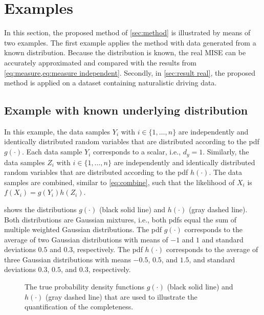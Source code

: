 \section{Examples}
\label{sec:results}

In this section, the proposed method of \cref{sec:method} is illustrated by means of two examples. The first example applies the method with data generated from a known distribution. Because the distribution is known, the real MISE can be accurately approximated and compared with the results from \cref{eq:measure,eq:measure independent}. Secondly, in \cref{sec:result real}, the proposed method is applied on a dataset containing naturalistic driving data.

\subsection{Example with known underlying distribution}
\label{sec:result artificial}

In this example, the data samples $Y_i$ with $i \in \{1, \ldots, n\}$ are independently and identically distributed random variables that are distributed according to the pdf $g(\cdot)$. Each data sample $Y_i$ corresponds to a scalar, i.e., $d_y=1$. Similarly, the data samples $Z_i$ with $i \in \{1, \ldots, n\}$ are independently and identically distributed random variables that are distributed according to the pdf $h(\cdot)$. The data samples are combined, similar to \cref{eq:combine}, such that the likelihood of $X_i$ is $f(X_i)=g(Y_i)h(Z_i)$. 

 shows the distributions $g(\cdot)$ (black solid line) and $h(\cdot)$ (gray dashed line). Both distributions are Gaussian mixtures, i.e., both pdfs equal the sum of multiple weighted Gaussian distributions. The pdf $g(\cdot)$ corresponds to the average of two Gaussian distributions with means of $-1$ and $1$ and standard deviations $0.5$ and $0.3$, respectively. The pdf $h(\cdot)$ corresponds to the average of three Gaussian distributions with means $-0.5$, $0.5$, and $1.5$, and standard deviations $0.3$, $0.5$, and $0.3$, respectively. 

\setlength\figurewidth{\linewidth}
\setlength{}
\begin{figure}
	\centering
	
	\caption{The true probability density functions $g(\cdot)$ (black solid line) and $h(\cdot)$ (gray dashed line) that are used to illustrate the quantification of the completeness.}
	\label{fig:true pdf}
\end{figure}

